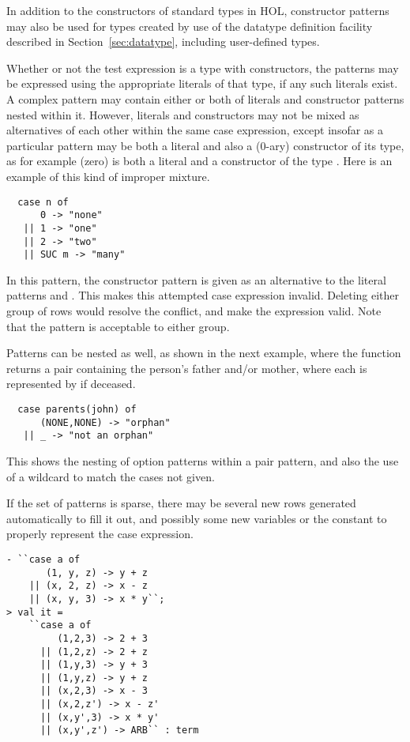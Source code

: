 In addition to the constructors of standard types in HOL{},
constructor patterns may also be used for types created by use of the
datatype definition facility described in Section~\ref{sec:datatype},
including user-defined types.

Whether or not the test expression is a type with constructors,
the patterns may be expressed using the appropriate literals of that type,
if any such literals exist.
A complex pattern may contain either or both of literals and constructor
patterns nested within it.
However, literals and constructors may not be mixed as alternatives of
each other within the same case expression,
except insofar as a particular pattern may be both a literal
and also a (0-ary) constructor of its type, as for example  (zero)
is both a literal and a constructor of the type .
Here is an example of this kind of improper mixture.
%
\begin{hol}
\begin{verbatim}
  case n of
      0 -> "none"
   || 1 -> "one"
   || 2 -> "two"
   || SUC m -> "many"
\end{verbatim}
\end{hol}
%
In this pattern, the constructor pattern  is given as
an alternative to the literal patterns  and .
This makes this attempted case expression invalid.
Deleting either group of rows would resolve the conflict,
and make the expression valid.
Note that the pattern  is acceptable to either group.

Patterns can be nested as well, as shown in the next example, where
the function  returns a pair containing the person's father
and/or mother, where each is represented by  if deceased.
%
\begin{hol}
\begin{verbatim}
  case parents(john) of
      (NONE,NONE) -> "orphan"
   || _ -> "not an orphan"
\end{verbatim}
\end{hol}
%
This shows the nesting of option patterns within a pair pattern,
and also the use of a wildcard \ml{\_} to match the cases not given.

If the set of patterns is sparse, there may be several new rows generated
automatically to fill it out, and possibly some new variables or the
 constant to properly represent the case expression.
%
\begin{hol}
\begin{verbatim}
- ``case a of
       (1, y, z) -> y + z
    || (x, 2, z) -> x - z
    || (x, y, 3) -> x * y``;
> val it =
    ``case a of
         (1,2,3) -> 2 + 3
      || (1,2,z) -> 2 + z
      || (1,y,3) -> y + 3
      || (1,y,z) -> y + z
      || (x,2,3) -> x - 3
      || (x,2,z') -> x - z'
      || (x,y',3) -> x * y'
      || (x,y',z') -> ARB`` : term
\end{verbatim}
\end{hol}

